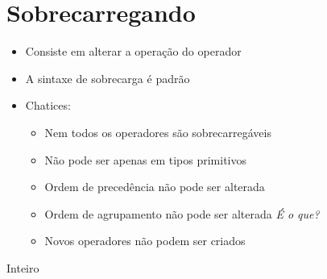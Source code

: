 \documentclass[14pt]{beamer}
\begin{document}
	\section{Sobrecarregando}
		\begin{frame}
			\begin{itemize}
				\presentationPause\item Consiste em alterar a operação do operador
				\presentationPause\item A sintaxe de sobrecarga é padrão
			\end{itemize}
			\presentationPause
			\begin{itemize}
				\presentationPause\item Chatices:
				\begin{itemize}
					\presentationPause\item Nem todos os operadores são sobrecarregáveis
					\presentationPause\item Não pode ser apenas em tipos primitivos
					\presentationPause\item Ordem de precedência não pode ser alterada
					\presentationPause\item Ordem de agrupamento não pode ser alterada \presentationPause \textit{É o que?}
					\presentationPause\item Novos operadores não podem ser criados
				\end{itemize}
			\end{itemize}
		\end{frame}

		\begin{frame}{Inteiro}
			\presentationPause
			\begin{columns}
				\begin{column}{.5\textwidth}
					
				\end{column}
				\begin{column}{.4\textwidth}
					
				\end{column}
			\end{columns}
		\end{frame}
\end{document}
